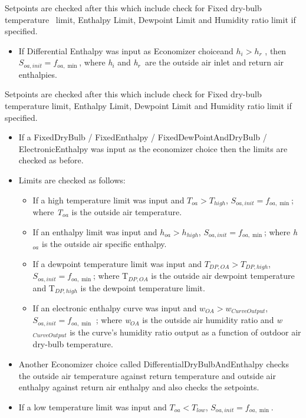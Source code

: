 Setpoints are checked after this which include check for Fixed dry-bulb temperature~ limit, Enthalpy Limit, Dewpoint Limit and Humidity ratio limit if specified.

\begin{itemize}
\item If Differential Enthalpy was input as Economizer choiceand \({h_i} > {h_r}\) , then \({S_{oa,init}} = {f_{oa,\min }}\), where \emph{h\(_{i}\)} and \emph{h\(_{r}\)}~are the outside air inlet and return air enthalpies.
\end{itemize}

Setpoints are checked after this which include check for Fixed dry-bulb temperature limit, Enthalpy Limit, Dewpoint Limit and Humidity ratio limit if specified.

\begin{itemize}
\item If a FixedDryBulb / FixedEnthalpy / FixedDewPointAndDryBulb / ElectronicEnthalpy was input as the economizer choice then the limits are checked as before.
\item Limits are checked as follows:
\begin{itemize}
\item If a high temperature limit was input and \({T_{oa}} > {T_{high}}\), \({S_{oa,init}} = {f_{oa,\min }}\); where \emph{T\(_{oa}\)} is the outside air temperature.
\item If an enthalpy limit was input and \({h_{oa}} > {h_{high}}\), \({S_{oa,init}} = {f_{oa,\min }}\); where \emph{h\(_{oa}\)} is the outside air specific enthalpy.
\item If a dewpoint temperature limit was input and \({T_{DP,OA}} > {T_{DP,high}}\), \({S_{oa,init}} = {f_{oa,\min }}\); where T\(_{DP,OA}\) is the outside air dewpoint temperature and T\(_{DP,high}\) is the dewpoint temperature limit.
\item If an electronic enthalpy curve was input and \({w_{OA}} > {w_{CurveOutput}}\), \({S_{oa,init}} = {f_{oa,\min }}\) ; where \emph{w}\(_{OA}\) is the outside air humidity ratio and \emph{w}\(_{CurveOutput}\) is the curve's humidity ratio output as a function of outdoor air dry-bulb temperature.
\end{itemize}
\item Another Economizer choice called DifferentialDryBulbAndEnthalpy checks the outside air temperature against return temperature and outside air enthalpy against return air enthalpy and also checks the setpoints.
\item If a low temperature limit was input and \({T_{oa}} < {T_{low}}\), \({S_{oa,init}} = {f_{oa,\min }}\).
\end{itemize}

